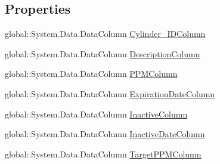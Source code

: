 \subsection*{Properties}
\begin{DoxyCompactItemize}
\item 
global\+::\+System.\+Data.\+Data\+Column \hyperlink{class_env_int_1_1_win32_1_1_field_tech_1_1_manager_1_1_data_sets_1_1_guide_ware_mobile_data_set_1_1_cylinder_data_table_a5a901fa227a85d1ddfa1e5a36f578654}{Cylinder\+\_\+\+I\+D\+Column}
\item 
global\+::\+System.\+Data.\+Data\+Column \hyperlink{class_env_int_1_1_win32_1_1_field_tech_1_1_manager_1_1_data_sets_1_1_guide_ware_mobile_data_set_1_1_cylinder_data_table_adf5b204b2c126b30b43d67a886b23eb8}{Description\+Column}
\item 
global\+::\+System.\+Data.\+Data\+Column \hyperlink{class_env_int_1_1_win32_1_1_field_tech_1_1_manager_1_1_data_sets_1_1_guide_ware_mobile_data_set_1_1_cylinder_data_table_ad150de1389bae399a2e08d7433a00bd9}{P\+P\+M\+Column}
\item 
global\+::\+System.\+Data.\+Data\+Column \hyperlink{class_env_int_1_1_win32_1_1_field_tech_1_1_manager_1_1_data_sets_1_1_guide_ware_mobile_data_set_1_1_cylinder_data_table_a660ffcdb5d293fd3a3ea4a616b2c32ea}{Expiration\+Date\+Column}
\item 
global\+::\+System.\+Data.\+Data\+Column \hyperlink{class_env_int_1_1_win32_1_1_field_tech_1_1_manager_1_1_data_sets_1_1_guide_ware_mobile_data_set_1_1_cylinder_data_table_ae9c507c9546e9fafeefe700d8e760966}{Inactive\+Column}
\item 
global\+::\+System.\+Data.\+Data\+Column \hyperlink{class_env_int_1_1_win32_1_1_field_tech_1_1_manager_1_1_data_sets_1_1_guide_ware_mobile_data_set_1_1_cylinder_data_table_aa390c06f91d1d875269cb7f0c85ad496}{Inactive\+Date\+Column}
\item 
global\+::\+System.\+Data.\+Data\+Column \hyperlink{class_env_int_1_1_win32_1_1_field_tech_1_1_manager_1_1_data_sets_1_1_guide_ware_mobile_data_set_1_1_cylinder_data_table_aa3d29bd19f24a6eb961180d237f2750d}{Target\+P\+P\+M\+Column}

\end{DoxyCompactItemize}
